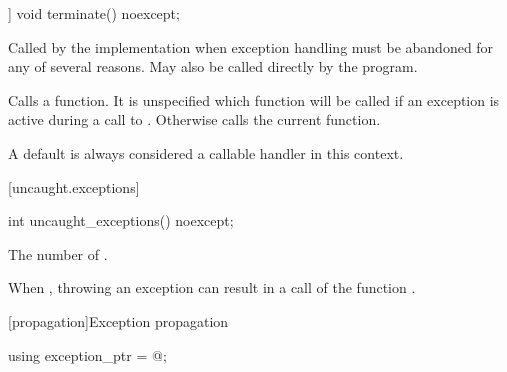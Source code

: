 %
\begin{itemdecl}
[[noreturn]] void terminate() noexcept;
\end{itemdecl}

\begin{itemdescr}
\pnum
\remarks
Called by the implementation when exception
handling must be abandoned for any of several reasons.
May also be called directly by the program.

\pnum
\effects
Calls a  function. It is unspecified which
 function will be called if an exception is active
during a call to .
Otherwise calls the current  function. \begin{note} A
default  is always considered a callable handler in
this context. \end{note}
\end{itemdescr}

[uncaught.exceptions]{}

%
\begin{itemdecl}
int uncaught_exceptions() noexcept;
\end{itemdecl}

\begin{itemdescr}
\pnum
\returns
The number of .

\pnum
\remarks
When ,
throwing an exception can result in a call of the function
.
\end{itemdescr}

[propagation]{Exception propagation}

\begin{indexed}{}
\begin{itemdecl}
using exception_ptr = @\unspec@;
\end{itemdecl}
\end{indexed}

